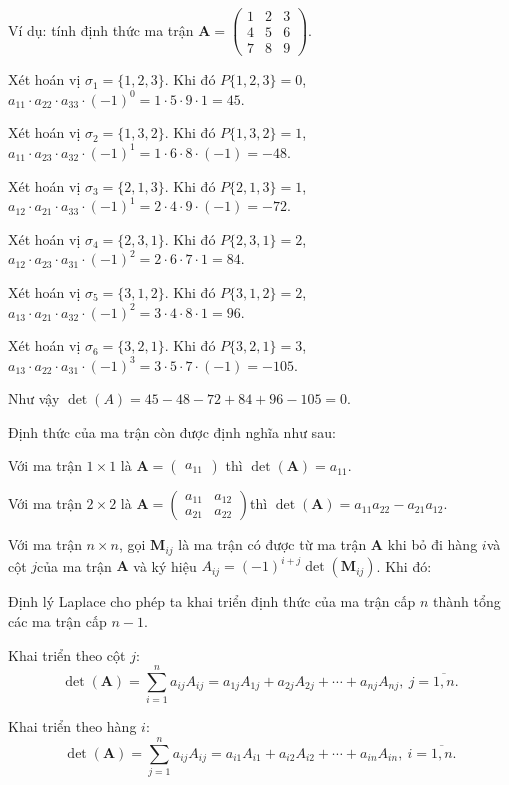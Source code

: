 \documentclass{mynotes}
\begin{document}
Ví dụ: tính định thức ma trận $\bm{A}=\begin{pmatrix}1 & 2 & 3 \\ 4 & 5 & 6 \\ 7 & 8 & 9\end{pmatrix}$​.

Xét hoán vị $\sigma_1 = \{1, 2, 3\}$​. Khi đó $P\{1, 2, 3\}=0$​, $a_{11} \cdot a_{22} \cdot a_{33} \cdot (-1)^0 = 1 \cdot 5 \cdot 9 \cdot 1 = 45$​.

Xét hoán vị $\sigma_2 = \{1, 3, 2\}$​. Khi đó $P\{1, 3, 2\} = 1$​, $a_{11} \cdot a_{23} \cdot a_{32} \cdot (-1)^1 = 1 \cdot 6 \cdot 8 \cdot (-1) = -48$.

Xét hoán vị $\sigma_3 = \{2, 1, 3\}$​. Khi đó $P\{2,1,3\}=1$​, $a_{12} \cdot a_{21} \cdot a_{33} \cdot (-1)^1 = 2 \cdot 4 \cdot 9 \cdot (-1) = -72$.

Xét hoán vị $\sigma_4=\{2,3,1\}$. Khi đó $P\{2, 3, 1\} = 2$​, $a_{12} \cdot a_{23} \cdot a_{31} \cdot (-1)^2 = 2 \cdot 6 \cdot 7 \cdot 1 = 84$​.

Xét hoán vị $\sigma_5=\{3, 1, 2\}$. Khi đó $P\{3, 1, 2\} = 2$​, $a_{13} \cdot a_{21} \cdot a_{32} \cdot (-1)^2 = 3 \cdot 4 \cdot 8 \cdot 1 = 96$​.

Xét hoán vị $\sigma_6=\{3, 2, 1\}$​. Khi đó $P\{3, 2, 1\}=3$​, $a_{13} \cdot a_{22} \cdot a_{31} \cdot (-1)^3 = 3 \cdot 5 \cdot 7 \cdot  (-1) = -105$​.

Như vậy $\det(A)=45-48-72+84+96-105=0$​.

Định thức của ma trận còn được định nghĩa như sau:

Với ma trận $1 \times 1$ là $\bm{A}=\begin{pmatrix}a_{11}\end{pmatrix}$ thì $\det(\bm{A})=a_{11}$.

Với ma trận $2 \times 2$ là $\bm{A} = \begin{pmatrix}a_{11} & a_{12} \\ a_{21} & a_{22}\end{pmatrix}$​ thì $\det(\bm{A})=a_{11}a_{22} - a_{21}a_{12}$.

Với ma trận $n \times n$, gọi $\bm{M}_{ij}$ là ma trận có được từ ma trận $\bm{A}$ khi bỏ đi hàng $i$​ và cột $j$​ của ma trận $\bm{A}$ và ký hiệu $A_{ij}=(-1)^{i+j} \det (\bm{M}_{ij})$. Khi đó:

\begin{theorem}
    Định lý Laplace cho phép ta khai triển định thức của ma trận cấp $n$ thành tổng các ma trận cấp $n-1$.

    Khai triển theo cột $j$​: \[ \det(\bm{A})=\displaystyle{\sum_{i=1}^na_{ij} A_{ij}} = a_{1j} A_{1j} + a_{2j} A_{2j} + \cdots + a_{nj} A_{nj},\ j = \overline{1, n}.\]

    Khai triển theo hàng $i$​: \[ \det(\bm{A})=\displaystyle{\sum_{j=1}^n a_{ij} A_{ij}} = a_{i1} A_{i1} + a_{i2} A_{i2} + \cdots + a_{in} A_{in},\ i = \overline{1, n}. \]​
\end{theorem}
\end{document}
